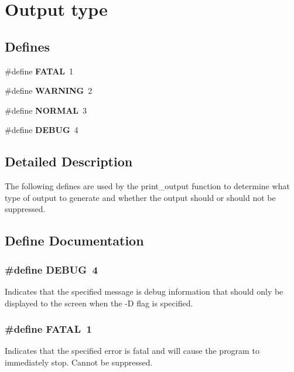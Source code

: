 \section{Output type}
\label{group__output__type}
\subsection*{Defines}
\begin{CompactItemize}
\item 
\#define {\bf FATAL}\ 1
\item 
\#define {\bf WARNING}\ 2
\item 
\#define {\bf NORMAL}\ 3
\item 
\#define {\bf DEBUG}\ 4
\end{CompactItemize}


\subsection{Detailed Description}
The following defines are used by the print\_\-output function to determine what type of output to generate and whether the output should or should not be suppressed. 

\subsection{Define Documentation}
\subsubsection{\setlength{\rightskip}{0pt plus 5cm}\#define DEBUG\ 4}\label{group__output__type_a3}


Indicates that the specified message is debug information that should only be displayed to the screen when the -D flag is specified. 
\subsubsection{\setlength{\rightskip}{0pt plus 5cm}\#define FATAL\ 1}\label{group__output__type_a0}


Indicates that the specified error is fatal and will cause the program to immediately stop. Cannot be suppressed. 
